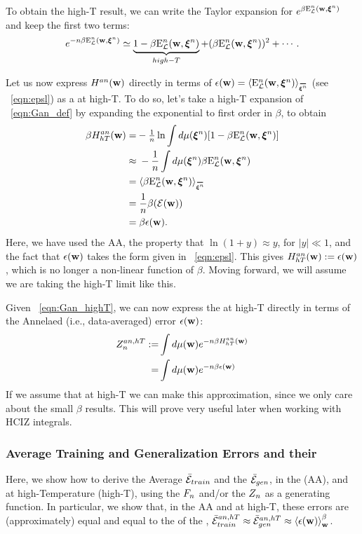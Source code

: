 To obtain the high-T result, we can write the Taylor expansion for $e^{\beta\mathbf{\mathrm{E}}^{n}_{\mathcal{L}}(\mathbf{w}, \boldsymbol{\xi}^{n})}$ and keep
the first two terms:
\begin{align}
  e^{-n\beta\mathbf{\mathrm{E}}^{n}_{\mathcal{L}}(\mathbf{w}, \boldsymbol{\xi}^{n})} \simeq \underbrace{1 - \beta\mathbf{\mathrm{E}}^{n}_{\mathcal{L}}(\mathbf{w}, \boldsymbol{\xi}^{n})}_{high-T}+ (\beta\mathbf{\mathrm{E}}^{n}_{\mathcal{L}}(\mathbf{w}, \boldsymbol{\xi}^{n}))^{2} + \cdots  .
\end{align}

Let us now express $H^{an}({\mathbf{w}})$ directly in terms of $\EPSLw=\langle\DETOPXI \rangle_{\AVGNDXIn}$ (see \EQN~\ref{eqn:epsl}) as a \ThermalAverage at high-T.
To do so, let's take a high-T expansion of \EQN~\ref{eqn:Gan_def} 
by expanding the exponential to first order in $\beta$, to obtain
\begin{align}
\beta\GANHT =&  - \tfrac{1}{\ND}\ln \int d\mu(\NDXIn) [1-\beta \DETOPXI] \nonumber \\
\approx&\;   - \frac{1}{\ND} \int d\mu(\NDXIn)\beta \DETOPXI \nonumber \\
=&\;\langle \beta\DETOPXI \rangle_{\AVGNDXIn} \nonumber \\
=&\;\frac{1}{\ND}\beta(\DETOT)  \nonumber \\
=&\;\beta \EPSLw  .
\label{eqn:Gan_highT}
\end{align}
Here, we have used the AA, the property that $\ln(1 + y) \approx y$, for $|y| \ll 1$, and the fact that $\epsilon({\mathbf{w}})$ takes the form given in \EQN~\ref{eqn:epsl}.
This gives $H^{an}_{hT}({\mathbf{w}}):=\epsilon({\mathbf{w}})$, which is no longer a non-linear function of $\beta$.
Moving forward, we will assume we are taking the high-T limit like this.

Given \EQN~\ref{eqn:Gan_highT}, we can now express the \Annealed \PartitionFunction at high-T directly in terms of
the Annelaed (i.e., data-averaged) error $\epsilon({\mathbf{w}})$:
\begin{align}
  \nonumber
  \label{eqn:Zanht_def}
Z^{an,hT}_{n} :=  &\int d\mu({\mathbf{w}}) e^{-n\beta H^{an}_{hT}({\mathbf{w}})} \\ 
  =  &\int d\mu({\mathbf{w}}) e^{-n\beta\epsilon({\mathbf{w}})} 
\end{align}
If we assume that at high-T we can make this approximation, 
since we only care about the small $\beta$ results. 
This will prove very useful later when working with HCIZ integrals.


\subsubsection{Average Training and Generalization Errors and their \GeneratingFunctions}
\label{sxn:mathP_errors}
Here, we show how to derive the Average \TrainingError $\bar{\mathcal{E}}_{train}$ and  the \AverageGeneralizationError $\bar{\mathcal{E}}_{gen}$,
in the \AnnealedApproximation (AA), and at high-Temperature (high-T), using the \FreeEnergy $F_{n}$ and/or the \PartitionFunction $Z_{n}$ as
a generating function.  
In particular, we show that, in the AA and at high-T, these errors are (approximately) equal
and equal to the \ThermalAverage of the \EffectivePotential,
$\bar{\mathcal{E}}_{train}^{an, hT} \approx \bar{\mathcal{E}}_{gen}^{an, hT} \approx \left\langle \epsilon({\mathbf{w}}) \right\rangle_{\mathbf w}^{\beta}$.

